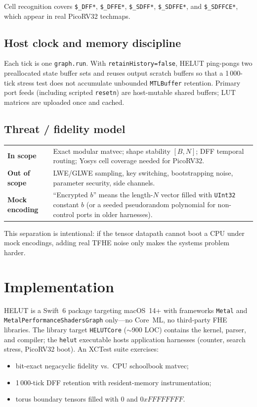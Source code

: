 \documentclass[11pt,a4paper]{article}
\begin{document}
Cell recognition covers \texttt{\$\_DFF*}, \texttt{\$\_DFFE*},
\texttt{\$\_SDFF*}, \texttt{\$\_SDFFE*}, and \texttt{\$\_SDFFCE*}, which appear
in real PicoRV32 techmaps.

\subsection{Host clock and memory discipline}

Each tick is one \texttt{graph.run}.
With \texttt{retainHistory=false}, HELUT ping-pongs two preallocated state buffer
sets and reuses output scratch buffers so that a 1\,000-tick stress test does not
accumulate unbounded \texttt{MTLBuffer} retention.
Primary port feeds (including scripted \texttt{resetn}) are host-mutable shared
buffers; LUT matrices are uploaded once and cached.

\subsection{Threat / fidelity model}
\label{sec:threat}

\begin{center}
\begin{tabular}{@{}lp{}@{}}
\toprule
\textbf{In scope} & Exact modular matvec; shape stability $[B,N]$; DFF temporal
routing; Yosys cell coverage needed for PicoRV32. \\
\textbf{Out of scope} & LWE/GLWE sampling, key switching, bootstrapping noise,
parameter security, side channels. \\
\textbf{Mock encoding} & ``Encrypted $b$'' means the length-$N$ vector filled with
\texttt{UInt32} constant $b$ (or a seeded pseudorandom polynomial for non-control
ports in older harnesses). \\
\bottomrule
\end{tabular}
\end{center}

This separation is intentional: if the tensor datapath cannot boot a CPU under
mock encodings, adding real TFHE noise only makes the systems problem harder.

\section{Implementation}
\label{sec:impl}

HELUT is a Swift~6 package targeting macOS~14+ with frameworks
\texttt{Metal} and \texttt{MetalPerformanceShadersGraph} only---no Core~ML, no
third-party FHE libraries.
The library target \texttt{HELUTCore} ($\sim$900 LOC) contains the kernel,
parser, and compiler; the \texttt{helut} executable hosts application harnesses
(counter, search stress, PicoRV32 boot).
An XCTest suite exercises:
\begin{itemize}[leftmargin=*,itemsep=1pt]
  \item bit-exact negacyclic fidelity vs.\ CPU schoolbook matvec;
  \item 1\,000-tick DFF retention with resident-memory instrumentation;
  \item torus boundary tensors filled with $0$ and $0xFFFFFFFF$.
\end{itemize}
\end{document}
